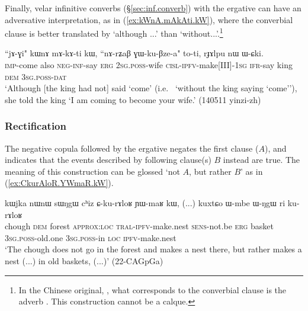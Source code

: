 Finally, velar infinitive converbs (§\ref{sec:inf.converb}) with the ergative can have an adversative interpretation,  as in (\ref{ex:kWnA.mAkAti.kW}), where the converbial clause is better translated by `although ...' than `without...'.\footnote{In the Chinese original, , what corresponds to the converbial clause is the adverb . This construction cannot be a calque.}

\begin{exe}
\ex \label{ex:kWnA.mAkAti.kW}
\gll  ``jɤ-ɣi" kɯnɤ mɤ-kɤ-ti kɯ, ``nɤ-rʑaβ ɣɯ-ku-βze-a" to-ti, rɟɤlpu nɯ ɯ-ɕki. \\
\textsc{imp}-come also \textsc{neg}-\textsc{inf}-say \textsc{erg} \textsc{2sg}.\textsc{poss}-wife \textsc{cisl}-\textsc{ipfv}-make[III]-\textsc{1sg} \textsc{ifr}-say king \textsc{dem} \textsc{3sg}.\textsc{poss}-\textsc{dat} \\
\glt `Although [the king had not] said `come' (i.e.  `without the king saying `come''), she told the king `I am coming to become your wife.'  (140511 yinzi-zh)
\end{exe}

\subsubsection{Rectification} \label{sec:rectification.clauses}
The negative copula  followed by the ergative  negates the first clause ($A$), and indicates that the events described by following clause(s) $B$ instead are true. The meaning of this construction can be glossed `not $A$, but rather $B$' as in (\ref{ex:CkurAloR.YWmaR.kW}). 

\begin{exe}
\ex \label{ex:CkurAloR.YWmaR.kW}
\gll  kɯjka nɯnɯ sɯŋgɯ cʰiz ɕ-ku-rɤloʁ ɲɯ-maʁ kɯ, (...) kuxtɕo ɯ-mbe ɯ-ŋgɯ ri ku-rɤloʁ \\
chough \textsc{dem} forest \textsc{approx}:\textsc{loc} \textsc{tral}-\textsc{ipfv}-make.nest \textsc{sens}-not.be \textsc{erg} { } basket \textsc{3sg}.\textsc{poss}-old.one \textsc{3sg}.\textsc{poss}-in \textsc{loc} \textsc{ipfv}-make.nest \\
\glt `The chough does not go in the forest and makes a nest there, but rather makes a nest (...) in old baskets, (...)' (22-CAGpGa)
\end{exe} 

